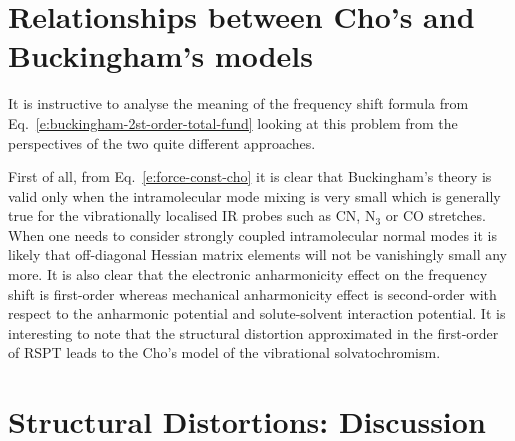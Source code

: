 \documentclass[a4paper,titlepage,twoside,fleqn,12pt]{book}
\begin{document}
\begin{refsection}
\section{Relationships between Cho's and Buckingham's models}

It is instructive to analyse the meaning of the frequency shift
formula from Eq.~\eqref{e:buckingham-2st-order-total-fund}
looking at this problem from the perspectives of the two quite different approaches.

First of all, from Eq.~\eqref{e:force-const-cho} it is clear 
that Buckingham's theory is valid only
when the intramolecular mode mixing is very small which
is generally true for the vibrationally localised IR probes
such as CN, N$_3$ or CO stretches. When one needs to consider
strongly coupled intramolecular normal modes it is likely
that off\hyp{}diagonal Hessian matrix elements will not be vanishingly
small any more. It is also
clear that the electronic anharmonicity effect on the frequency 
shift is first\hyp{}order
whereas mechanical anharmonicity effect is second\hyp{}order 
with respect to the anharmonic potential and solute\hyp{}solvent
interaction potential. It is interesting to note 
that the structural distortion approximated
in the first\hyp{}order of RSPT leads to the Cho's model of the vibrational
solvatochromism. 

\section{Structural Distortions: Discussion \label{s:str-dist-general-discussion}}


\end{refsection}
\end{document}
